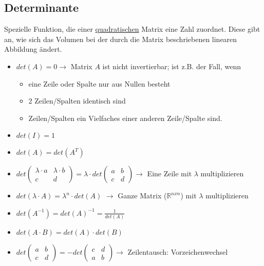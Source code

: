 \subsection{Determinante}

Spezielle Funktion, die einer \underline{quadratischen} Matrix eine Zahl zuordnet. Diese gibt an, wie sich das Volumen bei der durch die Matrix beschriebenen linearen Abbildung ändert. \\

\begin{itemize}
    \item \(det(A)= 0\rightarrow\) Matrix \(A\) ist nicht invertierbar; ist z.B. der Fall, wenn
    \begin{itemize}
        \item eine Zeile oder Spalte nur aus Nullen besteht
        \item 2 Zeilen/Spalten identisch sind
        \item Zeilen/Spalten ein Vielfaches einer anderen Zeile/Spalte sind.
    \end{itemize}
    \item \(det(I) = 1\)
    \item \(det(A) = det(A^T)\)
    \item \(det\begin{pmatrix}
            \lambda \cdot a & \lambda \cdot b \\
            c & d
        \end{pmatrix} = \lambda \cdot det\begin{pmatrix}
            a & b \\
            c & d
        \end{pmatrix} \rightarrow\) Eine Zeile mit \( \lambda \) multiplizieren
    \item \(det(\lambda\cdot A) = \lambda^n \cdot det(A)\) \(\rightarrow\) Ganze Matrix (\(\mathbb{R}^{nxn}\)) mit \( \lambda \) multiplizieren
    \item \(det(A^{-1}) = det(A)^{-1}=\frac{1}{det(A)}\)
    \item \(det(A\cdot B) = det(A)\cdot det(B)\)
    \item \(det\begin{pmatrix}
            a & b \\
            c & d
        \end{pmatrix} = -det\begin{pmatrix}
            c & d \\
            a & b
        \end{pmatrix}\rightarrow\) Zeilentausch: Vorzeichenwechsel
\end{itemize}



